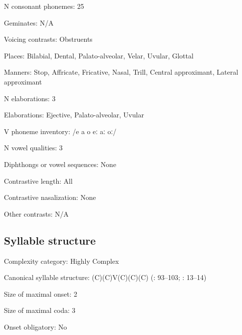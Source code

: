 {\begin{appendixdesc}
\item[N consonant phonemes:] 25

\item[Geminates:] N/A

\item[Voicing contrasts:] Obstruents

\item[Places:] Bilabial, Dental, Palato-alveolar, Velar, Uvular, Glottal

\item[Manners:] Stop, Affricate, Fricative, Nasal, Trill, Central approximant, Lateral approximant

\item[N elaborations:] 3

\item[Elaborations:] Ejective, Palato-alveolar, Uvular

\item[V phoneme inventory:] /e a o eː aː oː/

\item[N vowel qualities:] 3

\item[Diphthongs or vowel sequences:] None

\item[Contrastive length:] All

\item[Contrastive nasalization:] None

\item[Other contrasts:] N/A
\end{appendixdesc}
\subsection*{Syllable structure}
\begin{appendixdesc}

\item[Complexity category:] Highly Complex

\item[Canonical syllable structure:] (C)(C)V(C)(C)(C) (\citealt{FernándezGaray1998}: 93--103; \citealt{FernándezGarayHernández2006}: 13--14)

\item[Size of maximal onset:] 2

\item[Size of maximal coda:] 3

\item[Onset obligatory:] No


\end{appendixdesc}}

